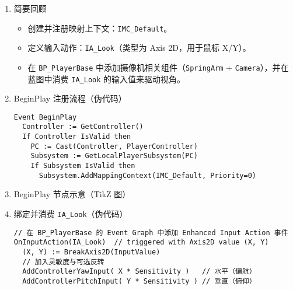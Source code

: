 \documentclass[10pt,CJKmath]{zhbook-v1}
\newcommand{\il}[1]{\texttt{#1}}%
\begin{document}
\begin{enumerate}
  \item 简要回顾
    \begin{itemize}
      \item 创建并注册映射上下文：\il{IMC_Default}。
      \item 定义输入动作：\il{IA_Look}（类型为 Axis 2D，用于鼠标 X/Y）。
      \item 在 \il{BP_PlayerBase} 中添加摄像机相关组件（\il{SpringArm} + \il{Camera}），并在蓝图中消费 \il{IA_Look} 的输入值来驱动视角。
    \end{itemize}

  \item BeginPlay 注册流程（伪代码）

\begin{verbatim}
Event BeginPlay
  Controller := GetController()
  If Controller IsValid then
    PC := Cast(Controller, PlayerController)
    Subsystem := GetLocalPlayerSubsystem(PC)
    If Subsystem IsValid then
      Subsystem.AddMappingContext(IMC_Default, Priority=0)
\end{verbatim}

  \item BeginPlay 节点示意（TikZ 图）
  \begin{center}
  \end{center}

  \item 绑定并消费 \il{IA_Look}（伪代码）
\begin{verbatim}
// 在 BP_PlayerBase 的 Event Graph 中添加 Enhanced Input Action 事件
OnInputAction(IA_Look)  // triggered with Axis2D value (X, Y)
  (X, Y) := BreakAxis2D(InputValue)
  // 加入灵敏度与可选反转
  AddControllerYawInput( X * Sensitivity )   // 水平（偏航）
  AddControllerPitchInput( Y * Sensitivity ) // 垂直（俯仰）
\end{verbatim}


\end{enumerate}
\end{document}

